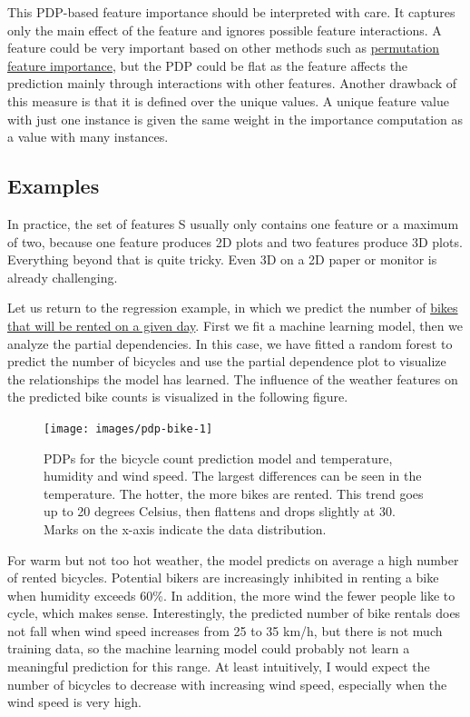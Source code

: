 \documentclass[
  12pt,
]{krantz}
\begin{document}
This PDP-based feature importance should be interpreted with care.
It captures only the main effect of the feature and ignores possible feature interactions.
A feature could be very important based on other methods such as \protect\hyperlink{feature-importance}{permutation feature importance}, but the PDP could be flat as the feature affects the prediction mainly through interactions with other features.
Another drawback of this measure is that it is defined over the unique values.
A unique feature value with just one instance is given the same weight in the importance computation as a value with many instances.

\hypertarget{examples}{%
\subsection{Examples}\label{examples}}

In practice, the set of features S usually only contains one feature or a maximum of two, because one feature produces 2D plots and two features produce 3D plots.
Everything beyond that is quite tricky.
Even 3D on a 2D paper or monitor is already challenging.

Let us return to the regression example, in which we predict the number of \protect\hyperlink{bike-data}{bikes that will be rented on a given day}.
First we fit a machine learning model, then we analyze the partial dependencies.
In this case, we have fitted a random forest to predict the number of bicycles and use the partial dependence plot to visualize the relationships the model has learned.
The influence of the weather features on the predicted bike counts is visualized in the following figure.

\begin{figure}

{\centering \texttt{[image: images/pdp-bike-1]} 

}

\caption{PDPs for the bicycle count prediction model and temperature, humidity and wind speed. The largest differences can be seen in the temperature. The hotter, the more bikes are rented. This trend goes up to 20 degrees Celsius, then flattens and drops slightly at 30. Marks on the x-axis indicate the data distribution.}\label{fig:pdp-bike}
\end{figure}

For warm but not too hot weather, the model predicts on average a high number of rented bicycles.
Potential bikers are increasingly inhibited in renting a bike when humidity exceeds 60\%.
In addition, the more wind the fewer people like to cycle, which makes sense.
Interestingly, the predicted number of bike rentals does not fall when wind speed increases from 25 to 35 km/h, but there is not much training data, so the machine learning model could probably not learn a meaningful prediction for this range.
At least intuitively, I would expect the number of bicycles to decrease with increasing wind speed, especially when the wind speed is very high.
\end{document}
